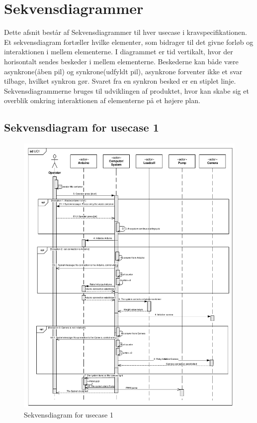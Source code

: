 \section{Sekvensdiagrammer}
Dette afsnit består af Sekvensdiagrammer til hver usecase i kravspecifikationen. Et sekvensdiagram fortæller hvilke elementer, som bidrager til det givne forløb og interaktionen i mellem elementerne. I diagrammet er tid vertikalt, hvor der horisontalt sendes beskeder i mellem elementerne. Beskederne kan både være asynkrone(åben pil) og synkrone(udfyldt pil), asynkrone forventer ikke et svar tilbage, hvilket synkron gør. Svaret fra en synkron besked er en stiplet linje. Sekvensdiagrammerne bruges til udviklingen af produktet, hvor kan skabe sig et overblik omkring interaktionen af elementerne på et højere plan.
\subsection{Sekvensdiagram for usecase 1} 
\begin{figure}[H]
	\centering
	\includegraphics[width=1\textwidth]{pdf/UC1crop.pdf}
	\caption{Sekvensdiagram for usecase 1}
	\label{fig:uc1}
\end{figure}

